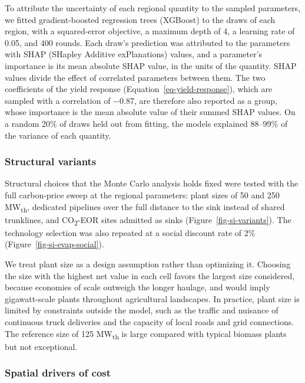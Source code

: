 \documentclass[
  letterpaper,
  twoside,
  twocolumn,
  9pt]{article}
\begin{document}
To attribute the uncertainty of each regional quantity to the sampled
parameters, we fitted gradient-boosted regression trees (XGBoost)
\citep{chen2016xgboost} to the draws of each region, with a
squared-error objective, a maximum depth of 4, a learning rate of 0.05,
and 400 rounds. Each draw's prediction was attributed to the parameters
with SHAP (SHapley Additive exPlanations) values,\citep{lundberg2017}
and a parameter's importance is its mean absolute SHAP value, in the
units of the quantity. SHAP values divide the effect of correlated
parameters between them. The two coefficients of the yield response
(Equation~\ref{eq-yield-response}), which are sampled with a correlation
of −0.87, are therefore also reported as a group, whose importance is
the mean absolute value of their summed SHAP values. On a random 20\% of
draws held out from fitting, the models explained 88--99\% of the
variance of each quantity.

\subsubsection{Structural variants}\label{structural-variants}

Structural choices that the Monte Carlo analysis holds fixed were tested
with the full carbon-price sweep at the regional parameters: plant sizes
of 50 and 250 MW\textsubscript{th}, dedicated pipelines over the full
distance to the sink instead of shared trunklines, and
CO\textsubscript{2}-EOR sites admitted as sinks
(Figure~\ref{fig-si-variants}). The technology selection was also
repeated at a social discount rate of 2\%
(Figure~\ref{fig-si-evap-social}).

We treat plant size as a design assumption rather than optimizing it.
Choosing the size with the highest net value in each cell favors the
largest size considered, because economies of scale outweigh the longer
haulage, and would imply gigawatt-scale plants throughout agricultural
landscapes. In practice, plant size is limited by constraints outside
the model, such as the traffic and nuisance of continuous truck
deliveries and the capacity of local roads and grid connections. The
reference size of 125 MW\textsubscript{th} is large compared with
typical biomass plants but not exceptional.

\subsubsection{Spatial drivers of cost}\label{spatial-drivers-of-cost}
\end{document}
